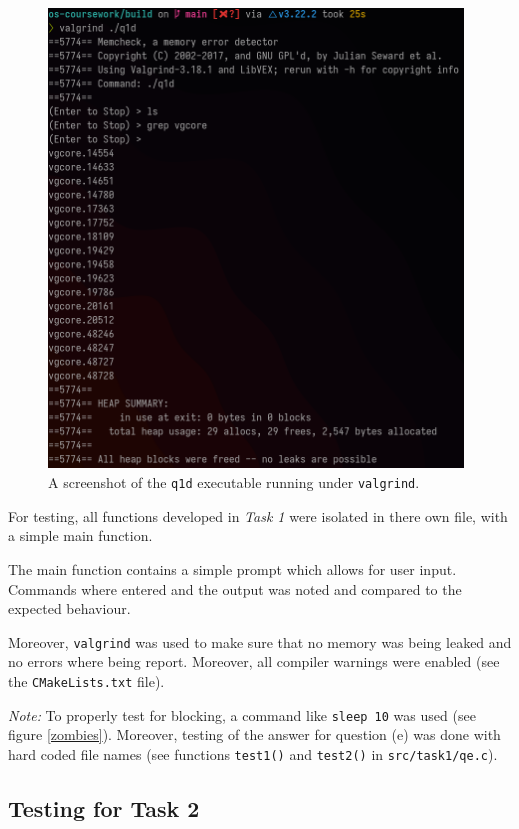 \documentclass[12pt]{article}
\begin{document}
\begin{figure}[H]
\centering
\includegraphics[width=11cm]{q1d-test}
\caption{A screenshot of the \texttt{q1d} executable running
under \texttt{valgrind}.}
\end{figure}

For testing, all functions developed in \textit{Task 1} were
isolated in there own file, with a simple main function.

The main function contains a simple prompt which allows for
user input. Commands where entered and the output was noted and
compared to the expected behaviour.

Moreover, \texttt{valgrind} was used to make sure that no memory
was being leaked and no errors where being report. Moreover, all
compiler warnings were enabled (see the \texttt{CMakeLists.txt}
file).

\textit{Note:} To properly test for blocking, a command like
\texttt{sleep 10} was used (see figure \ref{zombies}). Moreover,
testing of the answer for question (e) was done with hard coded
file names (see functions \texttt{test1()} and \texttt{test2()}
in \texttt{src/task1/qe.c}).

\subsection{Testing for Task 2}
\end{document}
